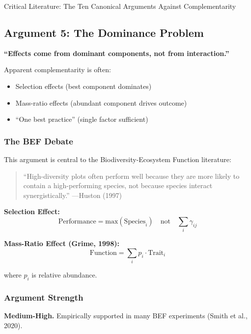 \begin{chapter}{Critical Literature: The Ten Canonical Arguments Against Complementarity}
\subsection{Argument 5: The Dominance Problem}
\label{sec:arg-dominance}

\begin{tcolorbox}[colback=red!5!white,colframe=red!75!black,title=\textbf{Core Claim}]
\textbf{``Effects come from dominant components, not from interaction.''}

Apparent complementarity is often:
\begin{itemize}[noitemsep]
    \item Selection effects (best component dominates)
    \item Mass-ratio effects (abundant component drives outcome)
    \item ``One best practice'' (single factor sufficient)
\end{itemize}
\end{tcolorbox}

\subsubsection{The BEF Debate}

This argument is central to the Biodiversity-Ecosystem Function literature:

\begin{quote}
``High-diversity plots often perform well because they are more likely to contain a high-performing species, not because species interact synergistically.'' ---Huston (1997)
\end{quote}

\textbf{Selection Effect:}
\[
\text{Performance} = \text{max}(\text{Species}_i) \quad \text{not} \quad \sum_i \gamma_{ij}
\]

\textbf{Mass-Ratio Effect (Grime, 1998):}
\[
\text{Function} = \sum_i p_i \cdot \text{Trait}_i
\]

where $p_i$ is relative abundance.

\subsubsection{Argument Strength}

\textbf{Medium-High.} Empirically supported in many BEF experiments (Smith et al., 2020).


\end{chapter}
